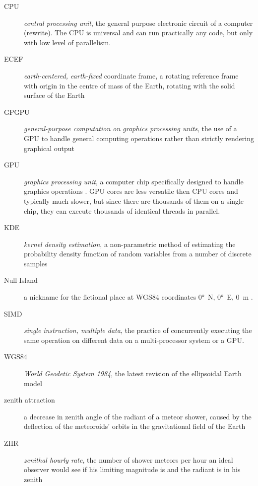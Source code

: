 \begin{description}
    \item[CPU]
        \emph{central processing unit}, the general purpose electronic circuit of a computer \cite{...} (rewrite).
        The CPU is universal and can run practically any code, but only with low level of parallelism.
    \item[ECEF]
        \emph{earth-centered, earth-fixed} coordinate frame, a rotating reference frame with origin
        in the centre of mass of the Earth, rotating with the solid surface of the Earth \cite{ecef}
    \item[GPGPU]
        \emph{general-purpose computation on graphics processing units},
        the use of a GPU to handle general computing operations rather than strictly rendering graphical output \cite{techterms}
    \item[GPU]
        \emph{graphics processing unit}, a computer chip specifically designed to handle graphics operations \cite{techterms}.
        GPU cores are less versatile then CPU cores and typically much slower, but since there are thousands of them on a single
        chip, they can execute thousands of identical threads in parallel.
    \item[KDE]
        \emph{kernel density estimation}, a non-parametric method of estimating the probability density function
        of random variables from a number of discrete samples \cite{kde}
    \item[Null Island]
        a nickname for the fictional place at WGS84 coordinates \ang{0}~N, \ang{0}~E, \SI{0}{\metre} \cite{null-island}.
    \item[SIMD]
        \emph{single instruction, multiple data}, the practice of concurrently executing the same operation on
        different data on a multi-processor system or a GPU.
    \item[WGS84]
        \emph{World Geodetic System 1984}, the latest revision of the ellipsoidal Earth model \cite{wgs84}
    \item[zenith attraction]
        a decrease in zenith angle of the radiant of a meteor shower, caused by the deflection of the meteoroids' orbits in the
        gravitational field of the Earth \cite{lovell1954}
    \item[ZHR]
        \emph{zenithal hourly rate}, the number of shower meteors per hour an ideal observer would see
            if his limiting magnitude is  and the radiant is in his zenith \cite{imo-glossary}

\end{description}
